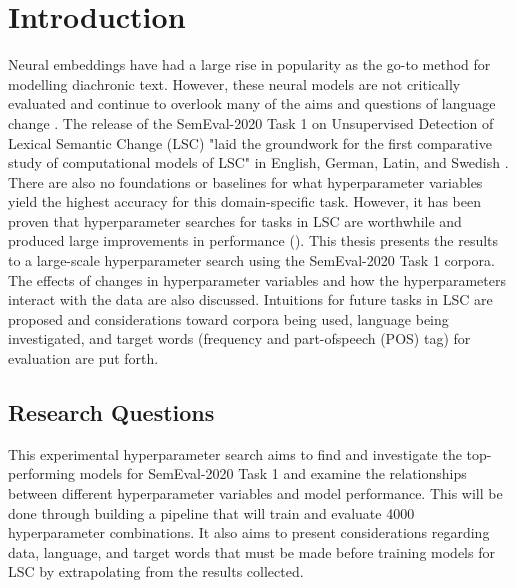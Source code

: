 

\section{Introduction}
\label{sec:intro}

Neural embeddings have had a large rise in popularity as the go-to method for modelling diachronic text. However, these neural models are not critically evaluated and continue to overlook many of the aims and questions of language change \citep{hengchen2021challenges}. The release of the SemEval-2020 Task 1 on Unsupervised Detection of Lexical Semantic Change (LSC) \citep{schlechtweg-etal-2020-semeval} "laid the groundwork for the first comparative study of computational models of LSC" in English, German, Latin, and Swedish \citep{hengchen2021SBXrushifteval}. There are also no foundations or baselines for what hyperparameter variables yield the highest accuracy for this domain-specific task. However, it has been proven that hyperparameter searches for tasks in LSC are worthwhile and produced large improvements in performance (\citet{kaiser-etal-2020-ims, hengchen2021SBXrushifteval}). This thesis presents the results to a large-scale hyperparameter search using the SemEval-2020 Task 1 corpora. The effects of changes in hyperparameter variables and how the hyperparameters interact with the data are also discussed. Intuitions for future tasks in LSC are proposed and considerations toward corpora being used, language being investigated, and target words (frequency and part-ofspeech (POS) tag) for evaluation are put forth. 


\subsection{Research Questions}
This experimental hyperparameter search aims to find and investigate the top-performing models for SemEval-2020 Task 1 and examine the relationships between different hyperparameter variables and model performance. This will be done through building a pipeline that will train and evaluate 4000 hyperparameter combinations. It also aims to present considerations regarding data, language, and target words that must be made before training models for LSC by extrapolating from the results collected. 



